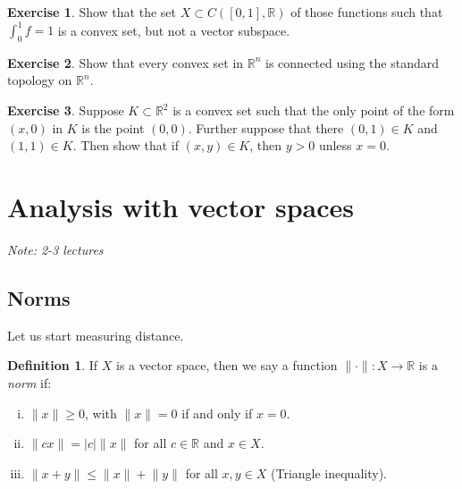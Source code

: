 \documentclass[12pt]{book}
\newcommand{\snorm}[1]{\lVert {#1} \rVert}
\newcommand{\abs}[1]{\left\lvert {#1} \right\rvert}
\newcommand{\R}{{\mathbb{R}}}
\newcommand{\myindex}[1]{#1\index{#1}}
\newcommand{\sectionnotes}[1]{\noindent \emph{Note: #1} \medskip \par}
\newcommand{\sectionnewpage}{\clearpage}
\theoremstyle{plain}
\theoremstyle{remark}
\theoremstyle{definition}
\newtheorem{defn}[thm]{Definition}
\theoremstyle{exercise}
\newtheorem{exercise}{Exercise}[section]
\theoremstyle{example}
\begin{document}
\begin{exercise}
Show that the set $X \subset C([0,1],\R)$ of those functions such 
that $\int_0^1 f = 1$ is a convex set, but not a vector subspace.
\end{exercise}


\begin{exercise}
Show that every convex set in $\R^n$ is connected using the standard
topology on $\R^n$.
\end{exercise}

\begin{exercise}
Suppose $K \subset \R^2$ is a convex set such that the only point of
the form $(x,0)$ in $K$ is the point $(0,0)$.  Further suppose that
there $(0,1) \in K$ and $(1,1) \in K$.  Then show that if $(x,y) \in K$,
then $y > 0$ unless $x=0$.
\end{exercise}



\sectionnewpage
\section{Analysis with vector spaces}
\label{sec:normsmatsdets}

\sectionnotes{2-3 lectures}

\subsection{Norms}

Let us start measuring distance.

\begin{defn}
If $X$ is a vector space, then we say
a function $\snorm{\cdot} \colon X \to \R$ is a \emph{\myindex{norm}} if:
\begin{enumerate}[(i)]
\item \label{defn:norm:i} $\snorm{x} \geq 0$, with $\snorm{x}=0$ if and only if $x=0$.
\item \label{defn:norm:ii} $\snorm{cx} = \abs{c}\snorm{x}$ for all $c \in \R$ and $x \in X$.
\item \label{defn:norm:iii} $\snorm{x+y} \leq \snorm{x}+\snorm{y}$ for all $x,y \in X$
\qquad (Triangle inequality).
\end{enumerate}
\end{defn}
\end{document}

